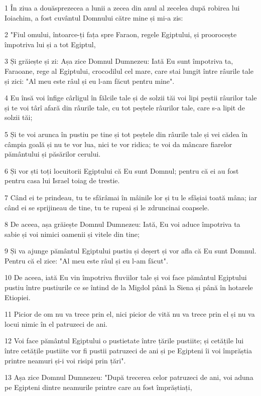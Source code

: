 \par 1 În ziua a douăsprezecea a lunii a zecea din anul al zecelea după robirea lui Ioiachim, a fost cuvântul Domnului către mine și mi-a zis:
\par 2 "Fiul omului, întoarce-ți fața spre Faraon, regele Egiptului, și proorocește împotriva lui și a tot Egiptul,
\par 3 Și grăiește și zi: Așa zice Domnul Dumnezeu: Iată Eu sunt împotriva ta, Faraoane, rege al Egiptului, crocodilul cel mare, care stai lungit între râurile tale și zici: "Al meu este râul și eu l-am făcut pentru mine".
\par 4 Eu însă voi înfige cârligul în fălcile tale și de solzii tăi voi lipi peștii râurilor tale și te voi târî afară din râurile tale, cu tot peștele râurilor tale, care s-a lipit de solzii tăi;
\par 5 Și te voi arunca în pustiu pe tine și tot peștele din râurile tale și vei cădea în câmpia goală și nu te vor lua, nici te vor ridica; te voi da mâncare fiarelor pământului și păsărilor cerului.
\par 6 Și vor ști toți locuitorii Egiptului că Eu sunt Domnul; pentru că ei au fost pentru casa lui Israel toiag de trestie.
\par 7 Când ei te prindeau, tu te sfărâmai în mâinile lor și tu le sfâșiai toată mâna; iar când ei se sprijineau de tine, tu te rupeai și le zdruncinai coapsele.
\par 8 De aceea, așa grăiește Domnul Dumnezeu: Iată, Eu voi aduce împotriva ta sabie și voi nimici oamenii și vitele din tine;
\par 9 Și va ajunge pământul Egiptului pustiu și deșert și vor afla că Eu sunt Domnul. Pentru că el zice: "Al meu este râul și eu l-am făcut".
\par 10 De aceea, iată Eu vin împotriva fluviilor tale și voi face pământul Egiptului pustiu între pustiurile ce se întind de la Migdol până la Siena și până în hotarele Etiopiei.
\par 11 Picior de om nu va trece prin el, nici picior de vită nu va trece prin el și nu va locui nimic în el patruzeci de ani.
\par 12 Voi face pământul Egiptului o pustietate între țările pustiite; și cetățile lui între cetățile pustiite vor fi pustii patruzeci de ani și pe Egipteni îi voi împrăștia printre neamuri și-i voi risipi prin țări".
\par 13 Așa zice Domnul Dumnezeu: "După trecerea celor patruzeci de ani, voi aduna pe Egipteni dintre neamurile printre care au fost împrăștiați,
